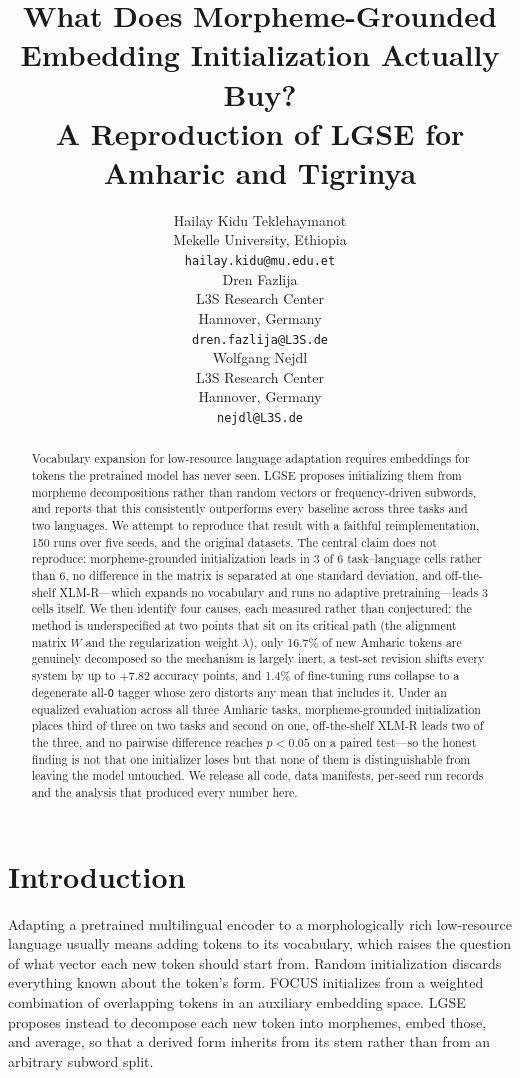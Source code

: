 \documentclass[11pt]{article}
\title{What Does Morpheme-Grounded Embedding Initialization Actually Buy?\\
A Reproduction of LGSE for Amharic and Tigrinya}
\author{Hailay Kidu Teklehaymanot \\
  Mekelle University, Ethiopia \\
  \texttt{hailay.kidu@mu.edu.et} \\\And
  Dren Fazlija \\
  L3S Research Center \\
  Hannover, Germany \\
  \texttt{dren.fazlija@L3S.de} \\\And
  Wolfgang Nejdl \\
  L3S Research Center \\
  Hannover, Germany \\
  \texttt{nejdl@L3S.de} \\}
\begin{document}
\maketitle

\begin{abstract}
Vocabulary expansion for low-resource language adaptation requires embeddings
for tokens the pretrained model has never seen. LGSE
\citep{teklehaymanot-etal-2026-lgse} proposes initializing them from
morpheme decompositions rather than random vectors or frequency-driven
subwords, and reports that this consistently outperforms every baseline
across three tasks and two languages. We attempt to reproduce that result
with a faithful reimplementation, 150 runs over five seeds, and the original
datasets. The central claim does not reproduce: morpheme-grounded
initialization leads in 3 of 6 task--language cells rather than 6, no
difference in the matrix is separated at one standard deviation, and
off-the-shelf XLM-R---which expands no vocabulary and runs no adaptive
pretraining---leads 3 cells itself. We then identify four causes, each
measured rather than conjectured: the method is underspecified at two points
that sit on its critical path (the alignment matrix $W$ and the
regularization weight $\lambda$), only 16.7\% of new Amharic tokens are
genuinely decomposed so the mechanism is largely inert, a test-set revision
shifts every system by up to $+7.82$ accuracy points, and 1.4\% of
fine-tuning runs collapse to a degenerate all-\texttt{O} tagger whose zero
distorts any mean that includes it. Under an equalized evaluation across all
three Amharic tasks, morpheme-grounded initialization places third of three
on two tasks and second on one, off-the-shelf XLM-R leads two of the three,
and no pairwise difference reaches $p < 0.05$ on a paired test---so the
honest finding is not that one initializer loses but that none of them is
distinguishable from leaving the model untouched. We release all code, data
manifests, per-seed run records and the analysis that produced every number
here.
\end{abstract}

\section{Introduction}

Adapting a pretrained multilingual encoder to a morphologically rich
low-resource language usually means adding tokens to its vocabulary, which
raises the question of what vector each new token should start from. Random
initialization discards everything known about the token's form.
FOCUS \citep{dobler-de-melo-2023-focus} initializes from a weighted
combination of overlapping tokens in an auxiliary embedding space. LGSE
\citep{teklehaymanot-etal-2026-lgse} proposes instead to decompose each new
token into morphemes, embed those, and average, so that a derived form
inherits from its stem rather than from an arbitrary subword split.
\end{document}
